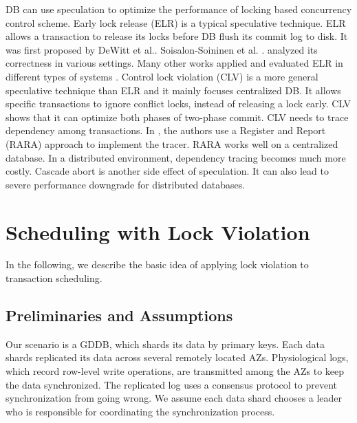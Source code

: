 \documentclass[conference]{IEEEtran}
\begin{document}
DB can use speculation to optimize the performance of locking based concurrency control scheme.
Early lock release (ELR)
\cite{ELR:dewitt_implementation_1984}\cite{PS2PL:conf/icdt/Soisalon-SoininenY95}
\cite{Aether:journals/pvldb/JohnsonPSAA10}
\cite{EfficientLocking:conf/vldb/KimuraGK12}
\cite{Actor-Oriented-DB:conf/icde/Bernstein18}
is a typical speculative technique.
ELR allows a transaction to release its locks before DB flush its commit log to disk.
It was first proposed by DeWitt et al.\cite{ELR:dewitt_implementation_1984}.
Soisalon-Soininen et al. .\cite{PS2PL:conf/icdt/Soisalon-SoininenY95} analyzed its correctness in various settings.
Many other works applied and evaluated ELR in different types of systems \cite{Aether:journals/pvldb/JohnsonPSAA10}\cite{EfficientLocking:conf/vldb/KimuraGK12}\cite{EfficientLocking:conf/vldb/KimuraGK12}\cite{Aether:journals/pvldb/JohnsonPSAA10}.
Control lock violation (CLV) \cite{CLV:conf/sigmod/GraefeLKTV13} is a more general speculative technique than ELR and it mainly focuses centralized DB.
It allows specific transactions to ignore conflict locks, instead of releasing a lock early.
CLV shows that it can optimize both phases of two-phase commit.
CLV needs to trace dependency among transactions.
In \cite{CLV:conf/sigmod/GraefeLKTV13}, the authors use a Register and Report (RARA) approach \cite{HeckatonMVCC:journals/pvldb/LarsonBDFPZ11} to implement the tracer.
RARA works well on a centralized database. In a distributed environment, dependency tracing becomes much more costly.
Cascade abort is another side effect of speculation. It can also lead to severe performance downgrade for distributed databases.


\section{Scheduling with Lock Violation}
\label{sec:non_strict}

In the following, we describe the basic idea of applying lock violation to transaction scheduling.

\subsection{Preliminaries and Assumptions}
Our scenario is a GDDB, which shards its data by primary keys.
Each data shards replicated its data across several remotely located AZs.
Physiological logs, which record row-level write operations, are transmitted among the AZs to keep the data synchronized.
The replicated log uses a consensus protocol to prevent synchronization from going wrong.
We assume each data shard chooses a leader who is responsible for coordinating the synchronization process.
\end{document}
